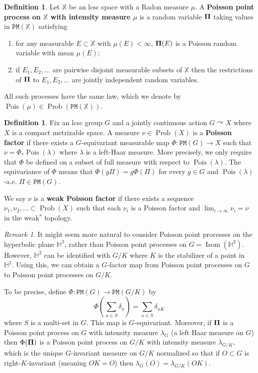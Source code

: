 \documentclass[11pt]{amsart}
\theoremstyle{definition}
\newtheorem{definition}[theorem]{Definition}
\theoremstyle{remark}
\newtheorem{remark}[theorem]{Remark}
\renewcommand{\H}{\mathbb{H}}
\newcommand{\bX}{\mathbb{X}}
\newcommand{\cP}{\mathtt{PM}}
\newcommand{\Isom}{\operatorname{Isom}}
\newcommand{\Pois}{\operatorname{Pois}}
\newcommand{\Prob}{\operatorname{Prob}}
\def\cc{{\curvearrowright}}
\def\bfPi{{\mbox{\boldmath $\Pi$}}}
\begin{document}
\begin{definition}
Let $\bX$ be an lcsc space with a Radon measure $\mu$. A {\bf Poisson point process on $\bX$ with intensity measure $\mu$} is a random variable $\bfPi$ taking values in $\cP(\bX)$ satisfying
\begin{enumerate}
    \item for any measurable $E \subset \bX$ with $\mu(E)<\infty$,  $\bfPi(E)$ is a Poisson random variable with mean $\mu(E)$;
    \item if $E_1,E_2,\ldots$ are pairwise disjoint measurable subsets of $\bX$ then the restrictions of $\bfPi$ to $E_1,E_2,\ldots$ are jointly independent random variables.
\end{enumerate}
All such processes have the same law, which we denote by $\Pois(\mu) \in \Prob(\cP(\bX))$.
\end{definition}




\begin{definition}
Fix an lcsc group $G$ and a jointly continuous action $G \cc X$ where $X$ is a compact metrizable space. A measure $\nu \in \Prob(X)$ is a \textbf{Poisson factor} if there exists a $G$-equivariant measurable map $\Phi:\cP(G) \to X$ such that $\nu = \Phi_*\Pois(\lambda)$ where $\lambda$ is a left-Haar measure. More precisely, we only require that $\Phi$ be defined on a subset of full measure with respect to $\Pois(\lambda)$. The equivariance of $\Phi$ means that $\Phi(g \Pi) = g \Phi(\Pi)$ for every $g\in G$ and $\Pois(\lambda)$-a.e. $\Pi \in \cP(G)$.

We say $\nu$ is a \textbf{weak Poisson factor} if there exists a sequence $\nu_1,\nu_2,\ldots \subset \Prob(X)$ such that each $\nu_i$ is a Poisson factor and $\lim_{i\to\infty} \nu_i = \nu$ in the weak$^*$ topology. 
\end{definition}

\begin{remark}
It might seem more natural to consider Poisson point processes on the hyperbolic plane $\H^2$, rather than Poisson point processes on $G=\Isom(\H^2)$. However, $\H^2$ can be identified with $G/K$ where $K$ is the stabilizer of a point in $\H^2$. Using this, we can obtain a $G$-factor map from Poisson point processes on $G$ to Poisson point processes on $G/K$.

To be precise, define $\Phi:\cP(G) \to \cP(G/K)$ by $$\Phi\left(\sum_{x\in S} \delta_x\right) = \sum_{x\in S} \delta_{xK}$$
where $S$ is a multi-set in $G$. This map is $G$-equivariant. Moreover, if $\bfPi$ is a Poisson point process on $G$ with intensity measure $\lambda_G$ (a left Haar measure on $G$) then $\Phi(\bfPi)$ is a Poisson point process on $G/K$ with intensity measure $\lambda_{G/K}$, which is the unique $G$-invariant measure on $G/K$ normalized so that if $O \subset G$ is right-$K$-invariant (meaning $OK=O$) then $\lambda_G(O)=\lambda_{G/K}(OK)$. 
\end{remark}
\end{document}
